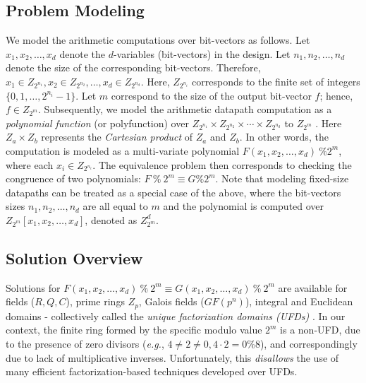 \subsection{Problem Modeling}
We model the arithmetic computations over bit-vectors as follows. Let
$x_1, x_2, \ldots, x_d$ denote the $d$-variables (bit-vectors) in the
design. Let $n_1, n_2, \ldots, n_d$ denote the size of the
corresponding bit-vectors.  Therefore, $x_1 \in Z_{2^{n_1}}, x_2 \in
Z_{2^{n_2}}, \ldots, x_d \in Z_{2^{n_d}}$. Here, $Z_{2^{n_i}}$
corresponds to the finite set of integers $\{0, 1, \ldots, 2^{n_i} -
1\}$. Let $m$ correspond to the size of the output bit-vector $f$;
hence, $f \in Z_{2^m}$. Subsequently, we model the arithmetic datapath
computation as a {\it polynomial function} (or polyfunction) over
$Z_{2^{n_1}} \times Z_{2^{n_2}} \times \cdots \times Z_{2^{n_d}}$ to
$Z_{2^m}$ \cite{chen_96}. Here $Z_a \times Z_b$ represents the {\it
Cartesian product} of $Z_a$ and $Z_b$. In other words, the computation
is modeled as a multi-variate polynomial $F(x_1, x_2, \ldots, x_d) ~\%
2^m$, where each $x_i \in Z_{2^{n_i}}$. The equivalence problem then
corresponds to checking the congruence of two polynomials: $F ~\% ~2^m
\equiv G\%2^m$. Note that modeling fixed-size datapaths can be treated as a
special case of the above, where the bit-vectors sizes $n_1, n_2,
\ldots, n_d$ are all equal to $m$ and the polynomial is computed over
$Z_{2^m}[x_1, x_2, \ldots, x_d]$, denoted as $Z_{2^m}^d$.

\subsection{Solution Overview}
Solutions for $F(x_1, x_2, \ldots, x_d) ~\% ~2^m \equiv G (x_1, x_2,
\ldots, x_d) ~\% ~2^m$ are available for fields ($R, Q, C$), prime
rings $Z_p$, Galois fields ($GF(p^n)$), integral and Euclidean domains
- collectively called the {\it unique factorization domains (UFDs)}
\cite{allenby:book}. In our context, the finite ring formed by the
specific modulo value $2^m$ is a non-UFD, due to the presence of zero
divisors ({\it e.g.}, $4 \neq 2 \neq 0, 4\cdot 2 = 0 \%8$), and
correspondingly due to lack of multiplicative inverses. Unfortunately,
this {\it disallows} the use of many efficient factorization-based
techniques developed over UFDs.

